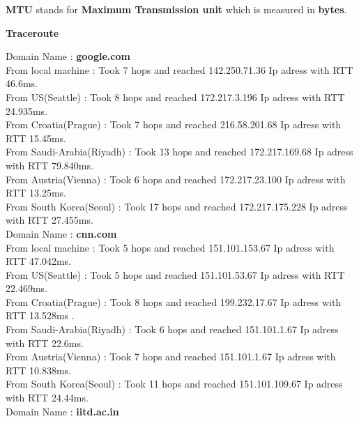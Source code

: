 \documentclass{article}
\theoremstyle{remark}
\newcommand{\tbf}[1]{\textbf{#1}}
\begin{document}
  
\tbf{MTU} stands for \tbf{Maximum Transmission unit} which is measured in \tbf{bytes}.

\tbf{\large{Traceroute}}

Domain Name : \tbf{google.com} \\

From local machine           : Took 7 hops and reached 142.250.71.36 Ip adress with RTT 46.6ms.\\
From US(Seattle)           : Took 8 hops and reached 172.217.3.196 Ip adress with RTT 24.935ms. \\
From Croatia(Prague)         : Took 7 hops and reached 216.58.201.68 Ip adress with RTT 15.45ms. \\
From Saudi-Arabia(Riyadh)  : Took 13 hops and reached 172.217.169.68 Ip adress with RTT 79.840ms. \\
From Austria(Vienna)       : Took 6 hops and reached 172.217.23.100 Ip adress with RTT 13.25ms. \\
From South Korea(Seoul)      : Took 17 hops and reached 172.217.175.228 Ip adress with RTT 27.455ms.\\  


Domain Name : \tbf{cnn.com} \\

From local machine           : Took 5 hops and reached 151.101.153.67 Ip adress with RTT 47.042ms.\\
From US(Seattle)           : Took 5 hops and reached 151.101.53.67 Ip adress with RTT 22.469ms. \\
From Croatia(Prague)         : Took 8 hops and reached 199.232.17.67 Ip adress with RTT 13.528ms . \\
From Saudi-Arabia(Riyadh)  : Took 6 hops and reached 151.101.1.67 Ip adress with RTT 22.6ms. \\
From Austria(Vienna)       : Took 7 hops and reached 151.101.1.67 Ip adress with RTT 10.838ms. \\
From South Korea(Seoul)      : Took 11 hops and reached 151.101.109.67 Ip adress with RTT 24.44ms.\\ 

Domain Name : \tbf{iitd.ac.in} \\
\end{document}
